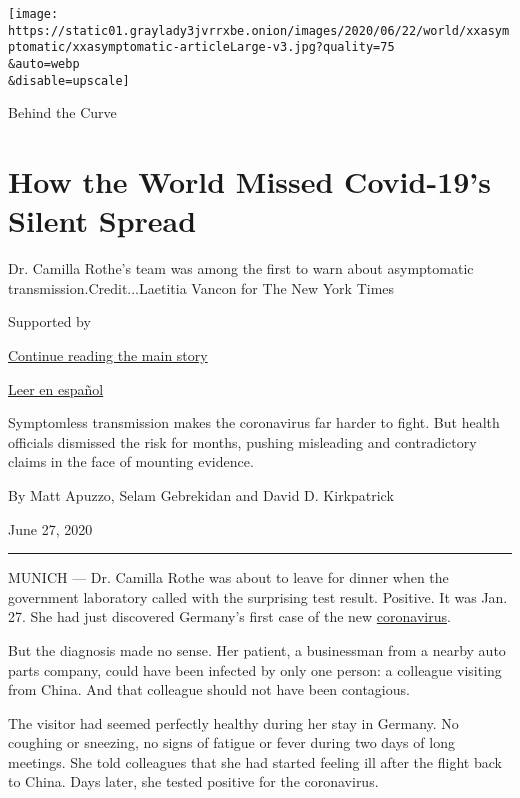 \texttt{[image: https://static01.graylady3jvrrxbe.onion/images/2020/06/22/world/xxasymptomatic/xxasymptomatic-articleLarge-v3.jpg?quality=75\\\&auto=webp\\\&disable=upscale]}

Behind the Curve

\hypertarget{how-the-world-missed-covid-19s-silent-spread}{%
\section{How the World Missed Covid-19's Silent
Spread}\label{how-the-world-missed-covid-19s-silent-spread}}

Dr. Camilla Rothe's team was among the first to warn about asymptomatic
transmission.Credit...Laetitia Vancon for The New York Times

Supported by

\protect\hyperlink{after-sponsor}{Continue reading the main story}

\href{https://www.nytimes3xbfgragh.onion/es/2020/06/29/espanol/mundo/coronavirus-asintomaticos.html}{Leer
en español}

Symptomless transmission makes the coronavirus far harder to fight. But
health officials dismissed the risk for months, pushing misleading and
contradictory claims in the face of mounting evidence.

By Matt Apuzzo, Selam Gebrekidan and David D. Kirkpatrick

June 27, 2020

\begin{center}\rule{0.5\linewidth}{\linethickness}\end{center}

MUNICH --- Dr. Camilla Rothe was about to leave for dinner when the
government laboratory called with the surprising test result. Positive.
It was Jan. 27. She had just discovered Germany's first case of the new
\href{https://www.nytimes3xbfgragh.onion/2020/08/06/health/coronavirus-asymptomatic-transmission.html}{coronavirus}.

But the diagnosis made no sense. Her patient, a businessman from a
nearby auto parts company, could have been infected by only one person:
a colleague visiting from China. And that colleague should not have been
contagious.

The visitor had seemed perfectly healthy during her stay in Germany. No
coughing or sneezing, no signs of fatigue or fever during two days of
long meetings. She told colleagues that she had started feeling ill
after the flight back to China. Days later, she tested positive for the
coronavirus.

